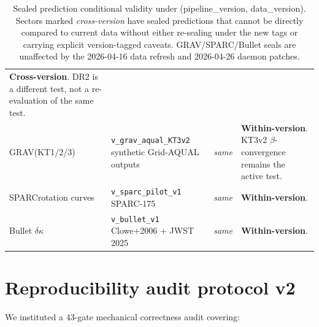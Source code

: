 \documentclass[11pt]{article}
\begin{document}
\begin{table}[h]
\begin{tabularx}{\linewidth}{@{}L{1.8cm} Y Y L{3.5cm}@{}}
\textcolor{ered}{\textbf{Cross-version}}. DR2 is a different test, not a re-evaluation of the same test. \\
\addlinespace[3pt]
GRAV\newline(KT1/2/3) &
\texttt{\footnotesize v\_grav\_aqual\_KT3v2}\newline
synthetic Grid-AQUAL outputs &
\textit{same} &
\textbf{Within-version}. KT3v2 $\beta$-convergence remains the active test. \\
\addlinespace[3pt]
SPARC\newline rotation curves &
\texttt{\footnotesize v\_sparc\_pilot\_v1}\newline
SPARC-175 &
\textit{same} &
\textbf{Within-version}. \\
\addlinespace[3pt]
Bullet $\delta\kappa$ &
\texttt{\footnotesize v\_bullet\_v1}\newline
Clowe+2006 + JWST 2025 &
\textit{same} &
\textbf{Within-version}. \\
\bottomrule
\end{tabularx}
\caption{Sealed prediction conditional validity under (pipeline\_version,
data\_version). Sectors marked \emph{cross-version} have sealed
predictions that cannot be directly compared to current data without
either re-sealing under the new tags or carrying explicit version-tagged
caveats. GRAV/SPARC/Bullet seals are unaffected by the 2026-04-16 data
refresh and 2026-04-26 daemon patches.}
\label{tab:sealed-risk}
\end{table}

\section{Reproducibility audit protocol v2}

We instituted a 43-gate mechanical correctness audit covering:
\end{document}
